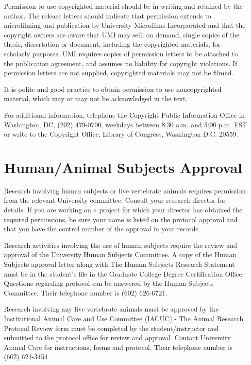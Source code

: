 \documentclass[draft]{ua-thesis}
\begin{document}
Permission to use copyrighted material should be in writing and retained by
the author. The release letters should indicate that permission extends to
microfilming and publication by University Microfilms Incorporated and that
the copyright owners are aware that UMI may sell, on demand, single copies
of the thesis, dissertation or document, including the copyrighted
materials, for scholarly purposes. UMI requires copies of permission letters
to be attached to the publication agreement, and assumes no liability for
copyright violations. If permission letters are not supplied, copyrighted
materials may not be filmed.

It is polite and good practice to obtain permission to use noncopyrighted
material, which may or may not be acknowledged in the text.

For additional information, telephone the Copyright Public Information
Office in Washington, DC, (202) 479-0700, weekdays between 8:30 a.m. and
5:00 p.m. EST or write to the Copyright Office, Library of Congress,
Washington D.C. 20559.

\chapter{Human/Animal Subjects Approval}

Research involving human subjects or live vertebrate animals requires
permission from the relevant University committee. Consult your research
director for details. If you are working on a project for which your
director has obtained the required permissions, be sure your name is listed
on the protocol approval and that you have the control number of the
approval in your records.

Research activities involving the use of human subjects require the review
and approval of the University Human Subjects Committee. A copy of the Human
Subjects approval letter along with The Human Subjects Research Statement
must be in the student's file in the Graduate College Degree Certification
Office. Questions regarding protocol can be answered by the Human Subjects
Committee. Their telephone number is (602) 626-6721.

Research involving any live vertebrate animals must be approved by the
Institutional Animal Care and Use Committee (IACUC) - The Animal Research
Protocol Review form must be completed by the student/instructor and
submitted to the protocol office for review and approval. Contact University
Animal Care for instructions, forms and protocol. Their telephone number is
(602) 621-3454
\end{document}
